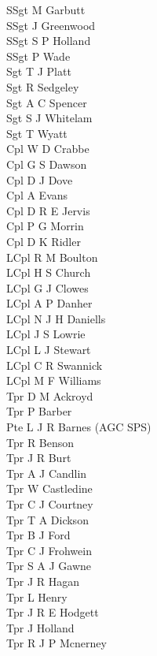 \begin{multicols}{3}
  \small
  \noindent
  SSgt M Garbutt \\
  SSgt J Greenwood \\
  SSgt S P Holland \\
  SSgt P Wade \\
  Sgt T J Platt \\
  Sgt R Sedgeley \\
  Sgt A C Spencer \\
  Sgt S J Whitelam \\
  Sgt T Wyatt \\
  Cpl W D Crabbe \\
  Cpl G S Dawson \\
  Cpl D J Dove \\
  Cpl A Evans \\
  Cpl D R E Jervis \\
  Cpl P G Morrin \\
  Cpl D K Ridler \\
  LCpl R M Boulton \\
  LCpl H S Church \\
  LCpl G J Clowes \\
  LCpl A P Danher \\
  LCpl N J H Daniells \\
  LCpl J S Lowrie \\
  LCpl L J Stewart \\
  LCpl C R Swannick \\
  LCpl M F Williams \\
  Tpr D M Ackroyd \\
  Tpr P Barber \\
  Pte L J R Barnes (AGC SPS) \\
  Tpr R Benson \\
  Tpr J R Burt \\
  Tpr A J Candlin \\
  Tpr W Castledine \\
  Tpr C J Courtney \\
  Tpr T A Dickson \\
  Tpr B J Ford \\
  Tpr C J Frohwein \\
  Tpr S A J Gawne \\
  Tpr J R Hagan \\
  Tpr L Henry \\
  Tpr J R E Hodgett \\
  Tpr J Holland \\
  Tpr R J P Mcnerney \\

\end{multicols}
